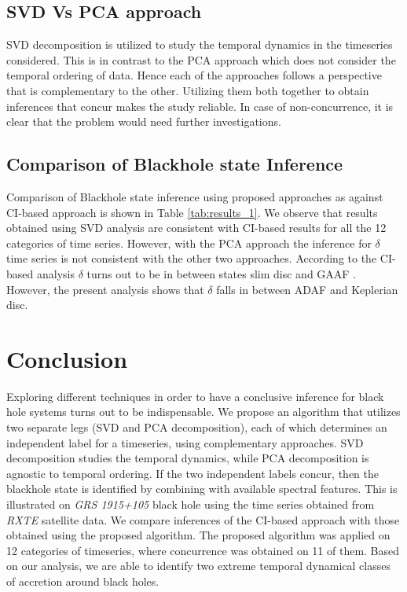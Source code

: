 \documentclass[journal]{IEEEtran}
\begin{document}
	\subsection {SVD Vs PCA approach} SVD decomposition is utilized to study the temporal dynamics in the timeseries considered. This is in contrast to the PCA approach which does not consider the temporal ordering of data. Hence each of the approaches follows a perspective that is complementary to the other. Utilizing them both together to obtain inferences that concur makes the study reliable. In case of non-concurrence, it is clear that the problem would need further investigations.

\subsection{Comparison of Blackhole state Inference}
Comparison of Blackhole state inference using proposed approaches as against CI-based approach \cite{Adegoke2018} is shown in Table \ref{tab:results_1}. We observe that results obtained using SVD analysis are consistent with CI-based results for all the 12 categories of time series. However, with the PCA approach the inference for  $\delta$ time series is not consistent with the other two approaches. According to the CI-based analysis $\delta$ turns out to be in between states slim disc and GAAF \cite{Adegoke2018}. However, the present analysis shows that $\delta$ falls in between ADAF and Keplerian disc.
	
	\section{Conclusion}
	Exploring different techniques in order to have a conclusive inference for black hole systems turns out to be indispensable. We propose an algorithm that utilizes two separate legs (SVD and PCA decomposition), each of which determines an independent label for a timeseries, using complementary approaches. SVD decomposition studies the temporal dynamics, while PCA decomposition is agnostic to temporal ordering. If the two independent labels concur, then the blackhole state is identified by combining with available spectral features. This is illustrated on \textit{GRS 1915+105} black hole using the time series obtained from \textit{RXTE} satellite data. We compare inferences of the CI-based approach with those obtained using the proposed algorithm. The proposed algorithm was applied on 12 categories of timeseries, where concurrence was obtained on 11 of them. Based on our analysis, we are able to identify two extreme temporal dynamical classes of accretion around black holes.
	
\end{document}

